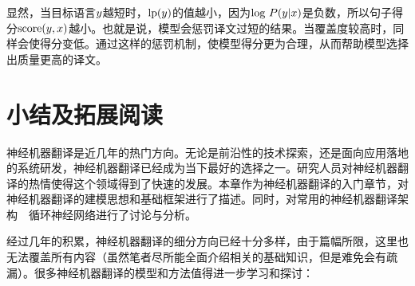 \noindent 显然，当目标语言${{y}}$越短时，$\textrm{lp}({{y}})$的值越小，因为$\textrm{log } {P}({{y}} | {{x}})$是负数，所以句子得分$\textrm{score} ( {{y}} , {{x}})$越小。也就是说，模型会惩罚译文过短的结果。当覆盖度较高时，同样会使得分变低。通过这样的惩罚机制，使模型得分更为合理，从而帮助模型选择出质量更高的译文。

\sectionnewpage
\section{小结及拓展阅读}

\parinterval 神经机器翻译是近几年的热门方向。无论是前沿性的技术探索，还是面向应用落地的系统研发，神经机器翻译已经成为当下最好的选择之一。研究人员对神经机器翻译的热情使得这个领域得到了快速的发展。本章作为神经机器翻译的入门章节，对神经机器翻译的建模思想和基础框架进行了描述。同时，对常用的神经机器翻译架构\ \dash \ 循环神经网络进行了讨论与分析。

\parinterval 经过几年的积累，神经机器翻译的细分方向已经十分多样，由于篇幅所限，这里也无法覆盖所有内容（虽然笔者尽所能全面介绍相关的基础知识，但是难免会有疏漏）。很多神经机器翻译的模型和方法值得进一步学习和探讨：

